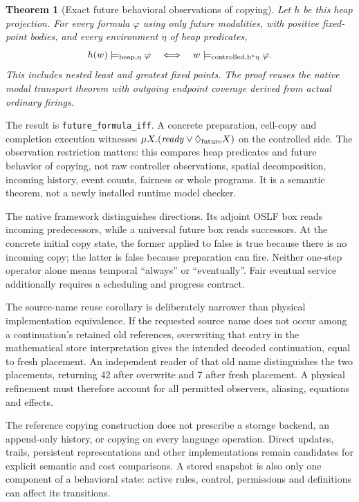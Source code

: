 \documentclass[11pt]{article}
\newtheorem{theorem}{Theorem}
\newcommand{\code}[1]{\texttt{\small #1}}
\begin{document}
\begin{theorem}[Exact future behavioral observations of copying]
Let $h$ be this heap projection. For every formula $\varphi$ using only
future modalities, with positive fixed-point bodies, and every environment
$\eta$ of heap predicates,
\[
  h(w)\models_{\rm heap,\eta}\varphi
  \quad\Longleftrightarrow\quad
  w\models_{\rm controlled,h^*\eta}\varphi.
\]
This includes nested least and greatest fixed points. The proof reuses the
native modal transport theorem with outgoing endpoint coverage derived
from actual ordinary firings.
\end{theorem}
The result is \code{future\_formula\_iff}. A concrete preparation,
cell-copy and completion execution witnesses
$\mu X.(\mathit{ready}\lor\Diamond_{\rm future}X)$ on the controlled side.
The observation restriction matters: this compares heap predicates and
future behavior of copying, not raw controller observations, spatial
decomposition, incoming history, event counts, fairness or whole programs.
It is a semantic theorem, not a newly installed runtime model checker.

The native framework distinguishes directions. Its adjoint OSLF box reads
incoming predecessors, while a universal future box reads successors.
At the concrete initial copy state, the former applied to false is true
because there is no incoming copy; the latter is false because preparation
can fire. Neither one-step operator alone means temporal ``always'' or
``eventually''. Fair eventual service additionally requires a scheduling
and progress contract.

The source-name reuse corollary is deliberately narrower than physical
implementation equivalence. If the requested source name does not occur
among a continuation's retained old references, overwriting that entry in
the mathematical store interpretation gives the intended decoded
continuation, equal to fresh placement. An independent reader of that old
name distinguishes the two placements, returning 42 after overwrite and 7
after fresh placement. A physical refinement must therefore account for
all permitted observers, aliasing, equations and effects.

The reference copying construction does not prescribe a storage backend,
an append-only history, or copying on every language operation. Direct
updates, trails, persistent representations and other implementations
remain candidates for explicit semantic and cost comparisons. A stored
snapshot is also only one component of a behavioral state: active rules,
control, permissions and definitions can affect its transitions.
\end{document}
